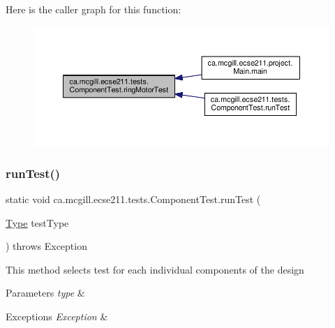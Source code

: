Here is the caller graph for this function\+:
\nopagebreak
\begin{figure}[H]
\begin{center}
\leavevmode
\includegraphics[width=350pt]{enumca_1_1mcgill_1_1ecse211_1_1tests_1_1_component_test_a1ecca45b47067d825683cf46dcf22b62_icgraph}
\end{center}
\end{figure}
\mbox{\label{enumca_1_1mcgill_1_1ecse211_1_1tests_1_1_component_test_a5dc8bf97bc48adf5bee88d425a1a974e}} 
\subsubsection{\texorpdfstring{run\+Test()}{runTest()}}
{\footnotesize\ttfamily static void ca.\+mcgill.\+ecse211.\+tests.\+Component\+Test.\+run\+Test (\begin{DoxyParamCaption}\item[{\hyperlink{enumca_1_1mcgill_1_1ecse211_1_1tests_1_1_component_test_1_1_type}{Type}}]{test\+Type }\end{DoxyParamCaption}) throws Exception\hspace{0.3cm}{\ttfamily [static]}}

This method selects test for each individual components of the design


\begin{DoxyParams}{Parameters}
{\em type} & \\
\hline
\end{DoxyParams}

\begin{DoxyExceptions}{Exceptions}
{\em Exception} & \\
\hline
\end{DoxyExceptions}


